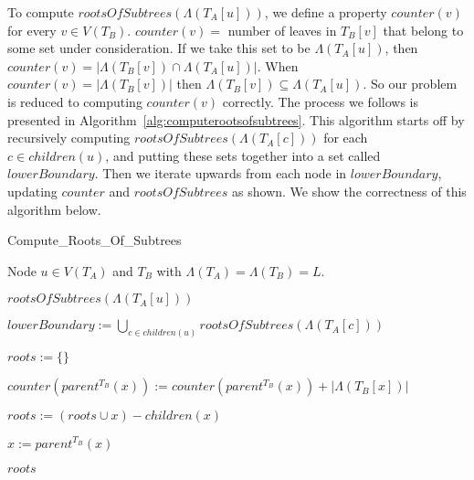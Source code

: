\documentclass{article}
\newcommand{\leafset}{\Lambda}
\begin{document}
    To compute $rootsOfSubtrees(\leafset(T_A[u]))$, we define a property $counter(v)$ for every $v \in V(T_B)$. $counter(v) =$ number of leaves in $T_B[v]$ that belong to some set under consideration. If we take this set to be $\leafset(T_A[u])$, then $counter(v) = |\leafset(T_B[v]) \cap \leafset(T_A[u])|$. When $counter(v) = |\leafset(T_B[v])|$ then $\leafset(T_B[v]) \subseteq \leafset(T_A[u])$. So our problem is reduced to computing $counter(v)$ correctly. The process we follows is presented in Algorithm~\ref{alg:computerootsofsubtrees}. This algorithm starts off by recursively computing $rootsOfSubtrees(\leafset(T_A[c]))$ for each $c \in children(u)$, and putting these sets together into a set called $lowerBoundary$. Then we iterate upwards from each node in $lowerBoundary$, updating $counter$ and $rootsOfSubtrees$ as shown. We show the correctness of this algorithm below.

    \begin{algorithm}
        \caption{Compute\_Roots\_Of\_Subtrees}
        \label{alg:computerootsofsubtrees}

        \begin{algorithmic}[1]
            \Input Node $u \in V(T_A)$ and $T_B$ with $\leafset(T_A) = \leafset(T_B) = L$.

            \Output $rootsOfSubtrees(\leafset(T_A[u]))$

            \State $lowerBoundary := \bigcup_{c \in children(u)} rootsOfSubtrees(\leafset(T_A[c]))$

            \State $roots := \{\}$

                \While{$counter(x) = |\leafset(T_B[x])|$}
                    \State $counter(parent^{T_B}(x)) := counter(parent^{T_B}(x)) + |\leafset(T_B[x])|$

                    \State $roots := (roots \cup {x}) - children(x)$

                    \State $x := parent^{T_B}(x)$
                \EndWhile
            \EndFor

            \State \Return $roots$
        \end{algorithmic}
    \end{algorithm}
\end{document}
